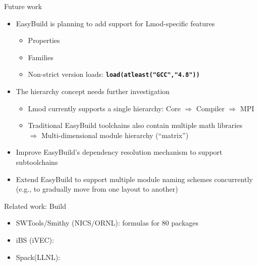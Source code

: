 \documentclass[10pt,xcolor={usenames,dvipsnames}]{beamer}
\begin{document}
\begin{frame}{Future work}
\begin{itemize}
    \item
        EasyBuild is planning to add support for Lmod-specific features
        \begin{itemize}
            \item
                Properties
            \item
                Families
            \item
                Non-strict version loads: \texttt{\bf load(atleast("GCC","4.8"))}
        \end{itemize}
    \smallskip
    \item
        The hierarchy concept needs further investigation
        \begin{itemize}
            \item
                Lmod currently supports a single hierarchy:
                Core $\Rightarrow$ Compiler $\Rightarrow$ MPI
            \item
                Traditional EasyBuild toolchains also contain multiple math
                libraries\\
                $\Rightarrow$ Multi-dimensional module hierarchy (``matrix'')
        \end{itemize}
    \smallskip
    \item
        Improve EasyBuild's dependency resolution mechanism to support
        subtoolchains
    \smallskip
    \item
        Extend EasyBuild to support multiple module naming schemes concurrently
        (e.g., to gradually move from one layout to another)
\end{itemize}
\end{frame}


\begin{frame}{Related work: Build}
\begin{itemize}
    \item SWTools/Smithy (NICS/ORNL): formulas for 80 packages
    \item iBS (iVEC):
    \item Spack(LLNL): 
\end{itemize}
\end{frame}

\end{document}
